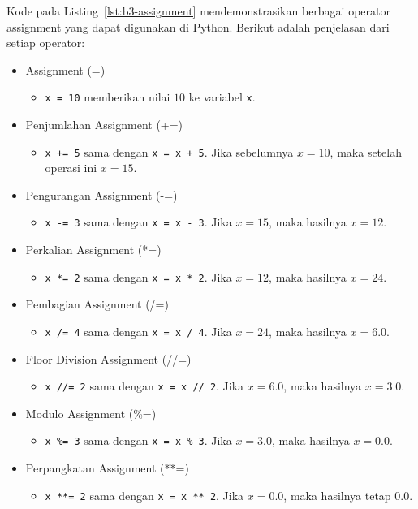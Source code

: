 Kode pada Listing~\ref{lst:b3-assignment} mendemonstrasikan berbagai operator assignment yang dapat digunakan di Python. 
Berikut adalah penjelasan dari setiap operator:
\begin{itemize}
    \item Assignment (=)
    \begin{itemize}
        \item \texttt{x = 10} memberikan nilai $10$ ke variabel \texttt{x}.
    \end{itemize}

    \item Penjumlahan Assignment (+=)
    \begin{itemize}
        \item \texttt{x += 5} sama dengan \texttt{x = x + 5}. Jika sebelumnya $x = 10$, maka setelah operasi ini $x = 15$.
    \end{itemize}

    \item Pengurangan Assignment (-=)
    \begin{itemize}
        \item \texttt{x -= 3} sama dengan \texttt{x = x - 3}. Jika $x = 15$, maka hasilnya $x = 12$.
    \end{itemize}

    \item Perkalian Assignment (*=)
    \begin{itemize}
        \item \texttt{x *= 2} sama dengan \texttt{x = x * 2}. Jika $x = 12$, maka hasilnya $x = 24$.
    \end{itemize}

    \item Pembagian Assignment (/=)
    \begin{itemize}
        \item \texttt{x /= 4} sama dengan \texttt{x = x / 4}. Jika $x = 24$, maka hasilnya $x = 6.0$.
    \end{itemize}

    \item Floor Division Assignment (//=)
    \begin{itemize}
        \item \texttt{x //= 2} sama dengan \texttt{x = x // 2}. Jika $x = 6.0$, maka hasilnya $x = 3.0$.
    \end{itemize}

    \item Modulo Assignment (\%=)
    \begin{itemize}
        \item \texttt{x \%= 3} sama dengan \texttt{x = x \% 3}. Jika $x = 3.0$, maka hasilnya $x = 0.0$.
    \end{itemize}

    \item Perpangkatan Assignment (**=)
    \begin{itemize}
        \item \texttt{x **= 2} sama dengan \texttt{x = x ** 2}. Jika $x = 0.0$, maka hasilnya tetap $0.0$.
    \end{itemize}
\end{itemize}


